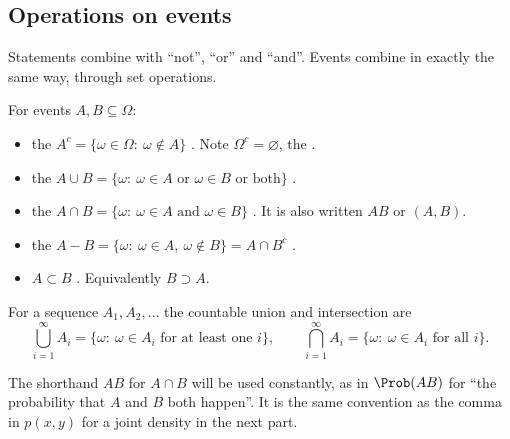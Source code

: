 \subsection{Operations on events}

Statements combine with ``not'', ``or'' and ``and''. Events combine in exactly
the same way, through set operations.

\begin{workdef}
For events $A,B\subseteq\Omega$:
\begin{itemize}[leftmargin=1.2em,itemsep=1pt]
\item the  $A^c=\{\omega\in\Omega:\ \omega\notin A\}$
  . Note $\Omega^c=\varnothing$,
  the .
\item the  $A\cup B=\{\omega:\ \omega\in A\text{ or }\omega\in B\text{ or both}\}$
  .
\item the  $A\cap B=\{\omega:\ \omega\in A\text{ and }\omega\in B\}$
  .
  It is also written $AB$ or $(A,B)$.
\item the  $A-B=\{\omega:\ \omega\in A,\ \omega\notin B\}=A\cap B^c$
  .
\item {} $A\subset B$ . Equivalently $B\supset A$.
\end{itemize}
For a sequence $A_1,A_2,\dots$ the countable union and intersection are
\[
\bigcup_{i=1}^\infty A_i=\{\omega:\ \omega\in A_i\text{ for at least one } i\},
\qquad
\bigcap_{i=1}^\infty A_i=\{\omega:\ \omega\in A_i\text{ for all } i\}.
\]
\end{workdef}

The shorthand $AB$ for $A\cap B$ will be used constantly, as in $\Prob(AB)$
for ``the probability that $A$ and $B$ both happen''. It is the same
convention as the comma in $p(x,y)$ for a joint density in the next part.

